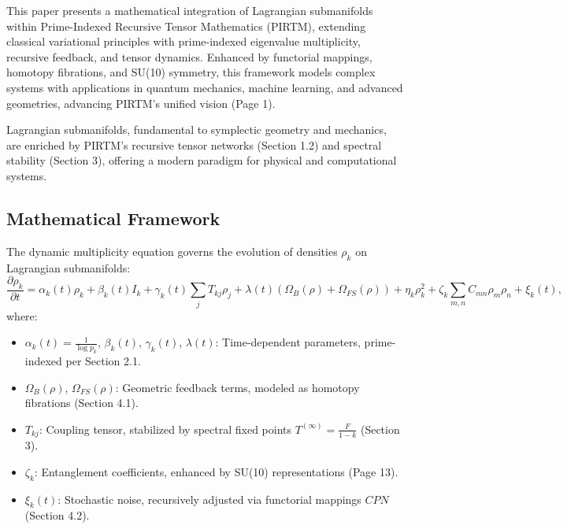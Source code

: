 \documentclass{article}
\theoremstyle{plain}
\begin{document}
This paper presents a mathematical integration of Lagrangian submanifolds within Prime-Indexed Recursive Tensor Mathematics (PIRTM), extending classical variational principles with prime-indexed eigenvalue multiplicity, recursive feedback, and tensor dynamics. Enhanced by functorial mappings, homotopy fibrations, and SU(10) symmetry, this framework models complex systems with applications in quantum mechanics, machine learning, and advanced geometries, advancing PIRTM’s unified vision (Page 1).

Lagrangian submanifolds, fundamental to symplectic geometry and mechanics, are enriched by PIRTM’s recursive tensor networks (Section 1.2) and spectral stability (Section 3), offering a modern paradigm for physical and computational systems.

\subsection{Mathematical Framework}
The dynamic multiplicity equation governs the evolution of densities \( \rho_k \) on Lagrangian submanifolds:
\begin{equation}
\frac{\partial \rho_k}{\partial t} = \alpha_k(t) \rho_k + \beta_k(t) I_k + \gamma_k(t) \sum_{j} T_{kj} \rho_j + \lambda(t) (\Omega_B(\rho) + \Omega_{FS}(\rho)) + \eta_k \rho_k^2 + \zeta_k \sum_{m,n} C_{mn} \rho_m \rho_n + \xi_k(t),
\label{eq:dynamic_multiplicity}
\end{equation}
where:
\begin{itemize}
    \item \( \alpha_k(t) = \frac{1}{\log p_k} \), \( \beta_k(t) \), \( \gamma_k(t) \), \( \lambda(t) \): Time-dependent parameters, prime-indexed per Section 2.1.
    \item \( \Omega_B(\rho) \), \( \Omega_{FS}(\rho) \): Geometric feedback terms, modeled as homotopy fibrations (Section 4.1).
    \item \( T_{kj} \): Coupling tensor, stabilized by spectral fixed points \( T^{(\infty)} = \frac{F}{1 - k} \) (Section 3).
    \item \( \zeta_k \): Entanglement coefficients, enhanced by SU(10) representations (Page 13).
    \item \( \xi_k(t) \): Stochastic noise, recursively adjusted via functorial mappings \( CPN \) (Section 4.2).
\end{itemize}
\end{document}
